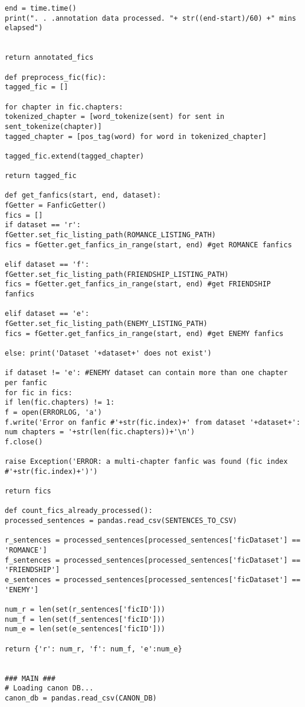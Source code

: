 \documentclass{pre-tfg}
\begin{document}
\begin{lstlisting}[style=consola]
end = time.time()
print(". . .annotation data processed. "+ str((end-start)/60) +" mins elapsed")


return annotated_fics

def preprocess_fic(fic):
tagged_fic = []

for chapter in fic.chapters:
tokenized_chapter = [word_tokenize(sent) for sent in sent_tokenize(chapter)]
tagged_chapter = [pos_tag(word) for word in tokenized_chapter]

tagged_fic.extend(tagged_chapter)

return tagged_fic

def get_fanfics(start, end, dataset):
fGetter = FanficGetter()
fics = []
if dataset == 'r':
fGetter.set_fic_listing_path(ROMANCE_LISTING_PATH)
fics = fGetter.get_fanfics_in_range(start, end) #get ROMANCE fanfics

elif dataset == 'f':
fGetter.set_fic_listing_path(FRIENDSHIP_LISTING_PATH)
fics = fGetter.get_fanfics_in_range(start, end) #get FRIENDSHIP fanfics

elif dataset == 'e':
fGetter.set_fic_listing_path(ENEMY_LISTING_PATH)
fics = fGetter.get_fanfics_in_range(start, end) #get ENEMY fanfics

else: print('Dataset '+dataset+' does not exist')

if dataset != 'e': #ENEMY dataset can contain more than one chapter per fanfic
for fic in fics:
if len(fic.chapters) != 1:
f = open(ERRORLOG, 'a')
f.write('Error on fanfic #'+str(fic.index)+' from dataset '+dataset+': num chapters = '+str(len(fic.chapters))+'\n')
f.close()

raise Exception('ERROR: a multi-chapter fanfic was found (fic index #'+str(fic.index)+')')

return fics

def count_fics_already_processed():
processed_sentences = pandas.read_csv(SENTENCES_TO_CSV)

r_sentences = processed_sentences[processed_sentences['ficDataset'] == 'ROMANCE']
f_sentences = processed_sentences[processed_sentences['ficDataset'] == 'FRIENDSHIP']
e_sentences = processed_sentences[processed_sentences['ficDataset'] == 'ENEMY']

num_r = len(set(r_sentences['ficID']))
num_f = len(set(f_sentences['ficID']))
num_e = len(set(e_sentences['ficID']))

return {'r': num_r, 'f': num_f, 'e':num_e}


### MAIN ###
# Loading canon DB...
canon_db = pandas.read_csv(CANON_DB)


\end{lstlisting}
\end{document}
